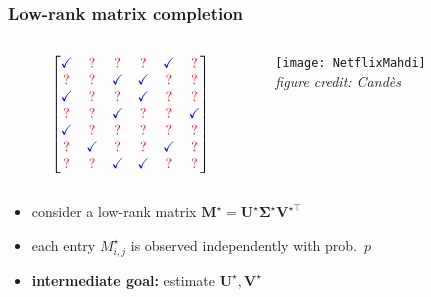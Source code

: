\documentclass[compress,
mathserif,wide,%
]{beamer}
\begin{document}
\begin{frame}
\frametitle{Low-rank matrix completion}



\begin{columns}
\begin{column}{0.5\textwidth}
\[
 \begin{bmatrix}
   {\color{blue} \checkmark} & {\color{red} ?} &{\color{red} ?}  & {\color{red} ?} & {\color{blue} \checkmark} & {\color{red} ?} \\
   {\color{red} ?} & {\color{red} ?} & {\color{blue} \checkmark} & {\color{blue} \checkmark} & {\color{red} ?} & {\color{red} ?} \\
   {\color{blue} \checkmark} & {\color{red} ?} & {\color{red} ?} & {\color{blue} \checkmark} & {\color{red} ?} & {\color{red} ?} \\
   {\color{red} ?} & {\color{red} ?} & {\color{blue} \checkmark}  & {\color{red} ?} &{\color{red} ?}  & {\color{blue} \checkmark} \\
   {\color{blue} \checkmark}  &  {\color{red} ?} & {\color{red} ?} & {\color{red} ?}  & {\color{red} ?} & {\color{red} ?} \\
   {\color{red} ?} & {\color{blue} \checkmark} &{\color{red} ?}  & {\color{red} ?} & {\color{blue} \checkmark} & {\color{red} ?} \\
   {\color{red} ?}  &{\color{red} ?} & {\color{blue} \checkmark} &
   {\color{blue} \checkmark} & {\color{red} ?} & {\color{red} ?}
\end{bmatrix}
\]
\end{column}

\begin{column}{0.5\textwidth}  
\begin{center}
\texttt{[image: NetflixMahdi]} \\
\hfill {\footnotesize\em figure credit: Cand\`es ~~}
\end{center}
\end{column}

\end{columns}



\begin{itemize}
	\itemsep0.5em
	\item consider a low-rank matrix $\bm{M}^{\star} = \bm{U}^{\star} \bm{\Sigma}^{\star} \bm{V}^{\star\top}$
	\item each entry $M_{i,j}^{\star}$   is observed independently with prob.~$p$
	\item {\bf intermediate goal:} estimate $\bm{U}^{\star}, \bm{V}^{\star}$
\end{itemize}


\end{frame}
\end{document}
